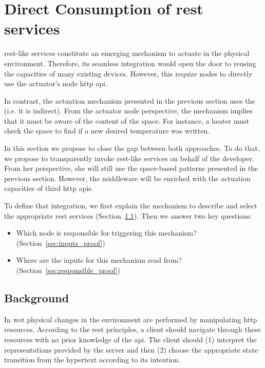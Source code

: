 
\section{Direct Consumption of \acs{rest} services}

\ac{rest}-like services constitute an emerging mechanism to actuate in the physical environment. %
Therefore, its seamless integration would open the door to reusing the capacities of many existing devices. %
However, this require nodes to directly use the actuator's node \ac{http} \ac{api}.


In contrast, the actuation mechanism presented in the previous section uses the \Space{} (i.e. it is indirect).
From the actuator node perspective, the mechanism implies that it must be aware of the content of the space.
For instance, a heater must check the space to find if a new desired temperature was written.


In this section we propose to close the gap between both approaches. %
To do that, we propose to transparently invoke \ac{rest}-like services on behalf of the developer.
From her perspective, she will still use the space-based patterns presented in the previous section.
However, the middleware will be enriched with the actuation capacities of third \ac{http} \acp{api}.


To define that integration, we first explain the mechanism to describe and select the appropriate \ac{rest} services (Section~\ref{sec:background_restdesc}).
Then we answer two key questions:
\begin{itemize}
  \item Which node is responsible for triggering this mechanism? (Section~\ref{sec:inputs_proof})
  \item Where are the inputs for this mechanism read from? (Section~\ref{sec:responsible_proof})
\end{itemize}



\subsection{Background}
\label{sec:background_restdesc}

In \ac{wot} physical changes in the environment are performed by manipulating \ac{http} resources.
According to the \ac{rest} principles, a client should navigate through these resources with no prior knowledge of the \ac{api}.
The client should (1) interpret the representations provided by the server and then (2) choose the appropriate state transition from the hypertext according to its intention. %


